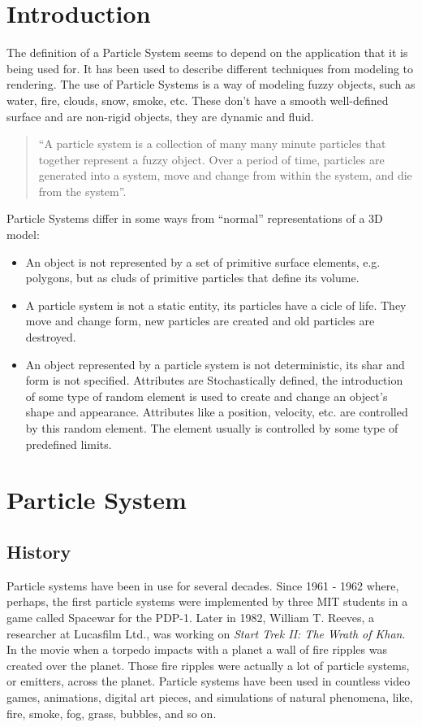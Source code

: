 \section{Introduction}

The definition of a Particle System seems to depend on the application that it is being used for. It has been used to describe different techniques from modeling to rendering. 
The use of Particle Systems is a way of modeling fuzzy objects, such as water, fire, clouds, snow, smoke, etc. These don't have a smooth well-defined surface and are non-rigid objects, they are dynamic and fluid.
\begin{quote}
  ``A particle system is a collection of many many minute particles that together represent a fuzzy object. Over a period of time, particles are generated into a system, move and change from within the system, and die from the system''.
\end{quote}

Particle Systems differ in some ways from ``normal'' representations of a 3D model:
\begin{itemize}
\item An object is not represented by a set of primitive surface elements, e.g. polygons, but as cluds of primitive particles that define its volume. 
\item A particle system is not a static entity, its particles have a cicle of life. They move and change form, new particles are created and old particles are destroyed.
\item An object represented by a particle system is not deterministic, its shar and form is not specified. Attributes are Stochastically defined, the introduction of some type of random element is used to create and change an object's shape and appearance. Attributes like a position, velocity, etc. are controlled by this random element. The element usually is controlled by some type of predefined limits.
\end{itemize}

\section{Particle System}

\subsection{History}
Particle systems have been in use for several decades. Since 1961 - 1962 where, perhaps, the first particle systems were implemented by three MIT students in a game called Spacewar for the PDP-1. Later in 1982, William T. Reeves, a researcher at Lucasfilm Ltd., was working on \emph{Start Trek II: The Wrath of Khan}. In the movie when a torpedo impacts with a planet a wall of fire ripples was created over the planet. Those fire  ripples were actually a lot of particle systems, or emitters, across the planet. Particle systems have been used in countless video games, animations, digital art pieces, and simulations of natural phenomena, like, fire, smoke, fog, grass, bubbles, and so on. 

